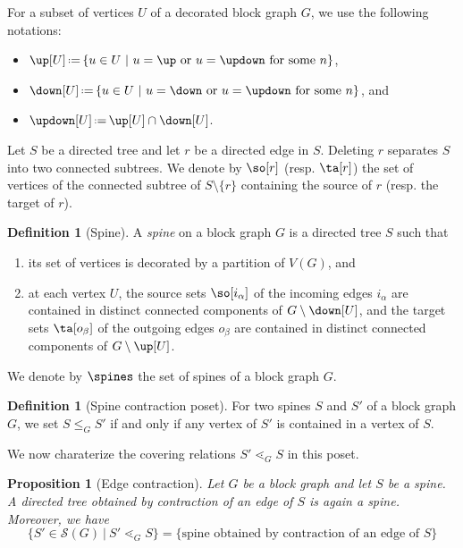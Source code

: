 \documentclass{amsart}
\newtheorem{proposition}[theorem]{Proposition}
\theoremstyle{definition}
\newtheorem{definition}[theorem]{Definition}
\newcommand{\eqdef}{\mbox{\,\raisebox{0.2ex}{\scriptsize\ensuremath{\mathrm:}}\ensuremath{=}\,}} %
\begin{document}
For a subset of vertices $U$ of a decorated block graph $G$, we use the following notations:
\begin{itemize}
  \item $\up[U] \eqdef \{u \in U \ | \ u=\up \text{ or  } u=\updown \text{ for some } n\}$, 
  \item  $\down[U] \eqdef \{u \in U \ | \ u=\down \text{ or  } u=\updown \text{ for some } n \}$, and 
  \item $\updown[U] \eqdef \up[U] \cap \down[U]$.
\end{itemize}

Let $S$ be a directed tree and let $r$ be a directed edge in $S$. Deleting $r$ separates $S$ into two connected subtrees. We denote by $\so[r]$ (resp. $\ta[r]$) the set of vertices of the connected subtree of $S \setminus \{r\}$ containing the source of $r$ (resp. the target of $r$).

\begin{definition}[Spine] A \emph{spine} on a block graph $G$ is a directed tree $S$ such that
\begin{enumerate}
  \item its set of vertices is decorated by a partition of $V(G)$, and 
  \item at each vertex $U$, the source sets $\so[i_\alpha]$ of the incoming edges $i_{\alpha}$ are contained in distinct connected components of $G \setminus \down[U]$, and the target sets $\ta[o_\beta]$ of the outgoing edges $o_\beta$ are contained in distinct connected components of $G \setminus \up[U]$.
\end{enumerate}
\end{definition}
We denote by $\spines$ the set of spines of a block graph $G$.

\begin{definition}[Spine contraction poset] 
  For two spines $S$ and $S'$ of a block graph $G$, we set $S \leq_G S'$ if and only if any vertex of $S'$ is contained in a vertex of $S$. 
\end{definition}

We now charaterize the covering relations $S'\lessdot_G S$ in this poset. 

\begin{proposition}[Edge contraction] \label{prop:edgecontraction} Let $G$ be a block graph and let $S$ be a spine. A directed tree obtained by contraction of an edge of $S$ is again a spine. Moreover, we have
\[\{ S'\in\mathcal{S}(G) \ | \ S'\lessdot_G S \}=\{\text{spine obtained by contraction of an edge of } S\}\]
\end{proposition}
\end{document}
